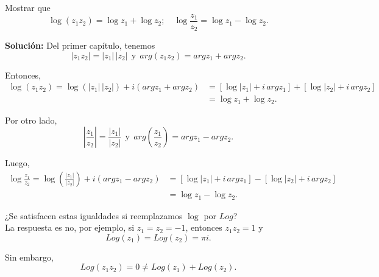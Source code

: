\begin{ejemplo}
Mostrar que 
$$\log(z_1 z_2) = \log z_1 + \log z_2; \quad \log \frac{z_1}{z_2} = \log z_1 - \log z_2. $$

\textbf{Solución:} Del primer capítulo, tenemos 
$$|z_1 z_2| = |z_1|\,|z_2| ~~\mbox{y}~~ arg(z_1 z_2) = arg z_1 + arg z_2.$$

Entonces,
\begin{align*}
\log(z_1 z_2) = \log (|z_1|\,|z_2|) + i (arg z_1 + arg z_2) &= [\log |z_1| + i\, arg z_1] + [\log |z_2| + i\, arg z_2] \\
&= \log z_1 + \log z_2.
\end{align*}

Por otro lado, 
$$\left|\frac{z_1}{z_2}\right| = \frac{|z_1|}{|z_2|} ~~\mbox{y}~~ arg\left( \frac{z_1}{z_2} \right) = arg z_1 - arg z_2.$$

Luego,
\begin{align*}
\log \frac{z_1}{z_2} = \log \left(\frac{|z_1|}{|z_2|}\right) + i (arg z_1 - arg z_2) &= [\log |z_1| + i\, arg z_1] - [\log |z_2| + i\, arg z_2] \\
&= \log z_1 - \log z_2.
\end{align*}

¿Se satisfacen estas igualdades si reemplazamos $\log$ por $Log$? 
\\

La respuesta es no, por ejemplo, si $z_1 = z_2 = -1$, entonces $z_1 z_2 = 1$ y 
$$Log(z_1) = Log(z_2) =  \pi i .$$

Sin embargo, 
$$Log(z_1 z_2) = 0 \neq Log(z_1) + Log(z_2).$$


\end{ejemplo}

